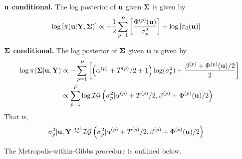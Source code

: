 \documentclass[12pt]{article}
\begin{document}
\bigskip
\noindent
\textbf{$\mathbf{u}$ conditional.} 
The log posterior of $\mathbf{u}$ given $\boldsymbol{\Sigma}$ is given by 
\begin{align*}
\log\left[\pi(\mathbf{u}|\mathbf{Y}, \boldsymbol{\Sigma})\right] &\propto -\frac{1}{2} \sum_{p = 1}^{P} \left[\frac{{\Phi}^{(p)}(\mathbf{u})}{\sigma_{p}^2}\right]  + \log\left[\pi_0(\mathbf{u})\right] 
\end{align*}

\bigskip
\noindent
\textbf{$\boldsymbol{\Sigma}$ conditional.}
The log posterior of $\boldsymbol{\Sigma}$ given $\mathbf{u}$ is given by 
\begin{align*}
\log \pi(\boldsymbol{\Sigma}|\mathbf{u}, \mathbf{Y}) &\propto -\sum_{p = 1}^{P} \left[\left({\alpha}^{(p)} + {T}^{(p)}/2 + 1 \right)\log(\sigma_{p}^2) + \frac{{\beta}^{(p)} + 
								  {\Phi}^{(p)}(\mathbf{u})/2}{2} \right] \\
				      			       &\propto \sum_{p = 1}^{P} \log \mathcal{IG}\left(\sigma_{p}^2|{\alpha}^{(p)} + {T}^{(p)}/2, {\beta}^{(p)} + {\Phi}^{(p)}(\mathbf{u})/2 \right)
\end{align*}
That is, 
\begin{align}
\sigma_{p}^2|\mathbf{u}, \mathbf{Y} &\overset{\text{ind}}{\sim} \mathcal{IG}\left(\sigma_{p}^2|{\alpha}^{(p)} + {T}^{(p)}/2, {\beta}^{(p)} + {\Phi}^{(p)}(\mathbf{u})/2 \right) \label{cond_post_Cov}
\end{align}

The Metropolis-within-Gibbs procedure is outlined below. 
\end{document}
